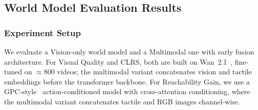 \documentclass{article}
\begin{document}





\subsection{World Model Evaluation Results}

\subsubsection{Experiment Setup}

We evaluate a Vision-only world model and a Multimodal one with early fusion architecture. For Visual Quality and CLRS, both are built on Wan~2.1~\citep{wan2025wan}, fine-tuned on $\approx$800 videos; the multimodal variant concatenates vision and tactile embeddings before the transformer backbone. For Reachability Gain, we use a GPC-style~\citep{qi2025strengthening} action-conditioned model with cross-attention conditioning, where the multimodal variant concatenates tactile and RGB images channel-wise.
\end{document}
